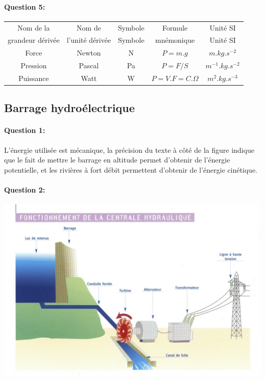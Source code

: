 \newpage

\paragraph{Question 5:}

\begin{center}
\begin{tabular}{|c|c|c|c|c|}
\hline
Nom de la & Nom de & Symbole & Formule & Unité SI \\
grandeur dérivée & l'unité dérivée & Symbole & mnémonique & Unité SI \\
\hline
Force & Newton & N & $P=m.g$ & $m.kg.s^{-2}$ \\
\hline
Pression & Pascal & Pa & $P=F/S$ & $m^{-1}.kg.s^{-2}$ \\
\hline
Puissance & Watt & W & $P=V.F=C.\Omega$ & $m^2.kg.s^{-3}$ \\
\hline
\end{tabular}
\end{center}

\subsection{Barrage hydroélectrique}

\paragraph{Question 1:} L'énergie utilisée est mécanique, la précision du texte à côté de la figure indique que le fait de mettre le barrage en altitude permet d'obtenir de l'énergie potentielle, et les rivières à fort débit permettent d'obtenir de l'énergie cinétique.

\paragraph{Question 2:}

\begin{center}
	\includegraphics[width=0.7\linewidth]{img/schema_barrage_cor}
\end{center}

